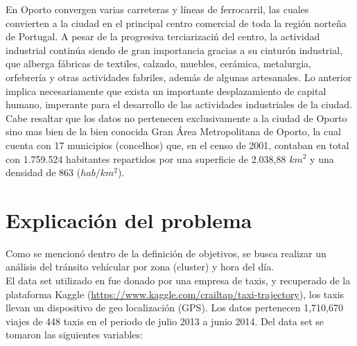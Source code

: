 \documentclass[a4paper]{article}
\begin{document}
\noindent
En Oporto convergen varias carreteras y líneas de ferrocarril, las cuales convierten a la ciudad en el principal centro comercial de toda la región norteña de Portugal. A pesar de la progresiva terciarizaci\'n del centro, la actividad industrial continúa siendo de gran importancia gracias a su cinturón industrial, que alberga fábricas de textiles, calzado, muebles, cerámica, metalurgia, orfebrería y otras actividades fabriles, además de algunas artesanales. Lo anterior implica necesariamente que exista un importante desplazamiento de capital humano, imperante para el desarrollo de las actividades industriales de la ciudad.\\

\noindent
Cabe resaltar que los datos no pertenecen exclusivamente a la ciudad de Oporto sino mas bien de la bien conocida Gran Área Metropolitana de Oporto, la cual cuenta con  17 municipios (concelhos) que, en el censo de 2001, contaban en total con 1.759.524 habitantes repartidos por una superficie de 2.038,88 $km^2$ y una densidad de 863 ($hab/km^2$). 

\section{Explicaci\'on del problema}
Como se mencionó dentro de la definición de objetivos, se busca realizar un an\'alisis del tr\'ansito vehícular por zona (cluster) y hora del día.\\

\noindent
El data set  utilizado en fue donado por una empresa de taxis, y recuperado de la plataforma Kaggle (\url{https://www.kaggle.com/crailtap/taxi-trajectory}), los taxis llevan un dispositivo de geo localizaci\'on (GPS). Los datos pertenecen 1,710,670 viajes de 448 taxis en el periodo de julio 2013 a junio 2014. Del data set se tomaron las siguientes variables:
\end{document}
